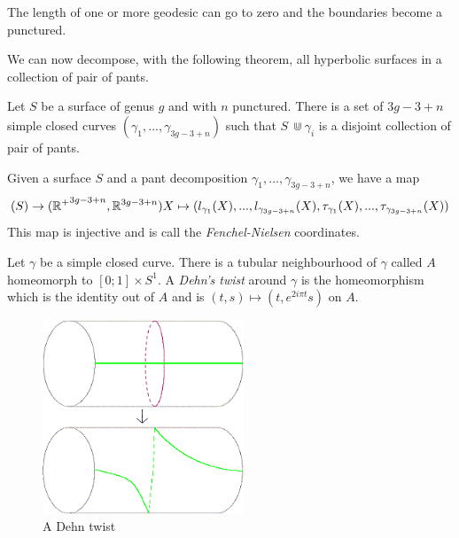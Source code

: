 \begin{rmq}
The length of one or more geodesic can go to zero and the boundaries become a punctured.
\end{rmq} %

We can now decompose, with the following theorem, all hyperbolic surfaces in a collection of pair of pants.

\begin{thm}
Let $S$ be a surface of genus $g$ and with $n$ punctured. There is a set of $3g-3+n$ simple closed curves $(\gamma_1,...,\gamma_{3g-3+n})$ such that $S\ \Cup \gamma_i$ is a disjoint collection of pair of pants.
\end{thm} %

\begin{dfnt}
Given a surface $S$ and a pant decomposition $\gamma_1,...,\gamma_{3g-3+n}$, we have a map \[
\mathcal(S) \rightarrow (\mathbb{R^{+}}^{3g-3+n},\mathbb{R}^{3g-3+n}) \\
X \mapsto (l_{\gamma_1}(X),...,l_{\gamma_{3g-3+n}}(X),\tau_{\gamma_1}(X),...,\tau_{\gamma_{3g-3+n}}(X))
\]
This map is injective and is call the \emph{Fenchel-Nielsen} coordinates.
\end{dfnt}

\begin{dfnt}
Let $\gamma$ be a simple closed curve. There is a tubular neighbourhood of $\gamma$ called $A$ homeomorph to $[0;1] \times S^{1}$.
A \emph{Dehn's twist} around $\gamma$ is the homeomorphism which is the identity out of $A$ and is $(t,s) \mapsto (t,e^{2i \pi t} s)$ on $A$.
\end{dfnt}

\begin{figure}[!h]
\centering
\includegraphics[width=6cm]{Image/Dehn_twist.png}
\caption{A Dehn twist}
\end{figure}

